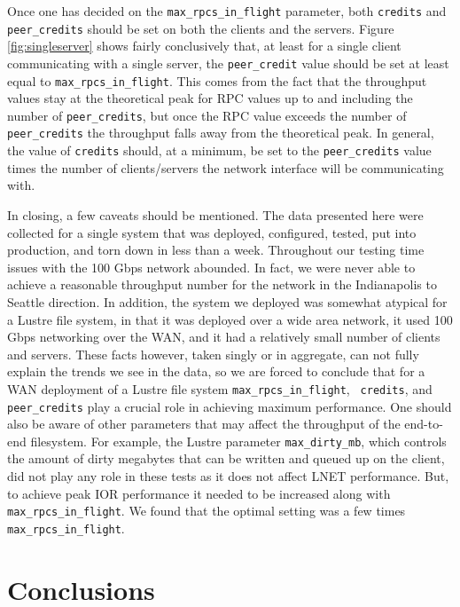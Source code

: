 \documentclass[]{sig-alternate}
\begin{document}
Once one has decided on the {\tt max\_rpcs\_in\_flight} parameter, both {\tt credits} and {\tt peer\_credits}
should be set on both the clients and the servers. Figure \ref{fig:singleserver} shows fairly conclusively
that, at least for a single client communicating with a single server, the {\tt peer\_credit} value should be
set at least equal to {\tt max\_rpcs\_in\_flight}. This comes from the fact that the throughput values stay at
the theoretical peak for RPC values up to and including the number of {\tt peer\_credits}, but once the RPC
value exceeds the number of {\tt peer\_credits} the throughput falls away from the theoretical peak. In
general, the value of {\tt credits} should, at a minimum, be set to the {\tt peer\_credits} value times the number of
clients/servers the network interface will be communicating with.

In closing, a few caveats should be mentioned. The data presented here were collected for a single system that
was deployed, configured, tested, put into production, and torn down in less than a week. Throughout our
testing time issues with the 100 Gbps network abounded. In fact, we were never able to achieve a reasonable
throughput number for the network in the Indianapolis to Seattle direction. In addition, the system we
deployed was somewhat atypical for a Lustre file system, in that it was deployed over a wide area network, it
used 100 Gbps networking over the WAN, and it had a relatively small number of clients and servers. These
facts however, taken singly or in aggregate, can not fully explain the trends we see in the data, so we are
forced to conclude that for a WAN deployment of a Lustre file system {\tt max\_rpcs\_in\_flight}, {\tt
  credits}, and {\tt peer\_credits} play a crucial role in achieving maximum performance. One should also be
aware of other parameters that may affect the throughput of the end-to-end filesystem. For example, the Lustre
parameter {\tt max\_dirty\_mb}, which controls the amount of dirty megabytes that can be written and queued up
on the client, did not play any role in these tests as it does not affect LNET performance.
But, to achieve peak IOR performance it needed to be increased along with {\tt max\_rpcs\_in\_flight}. We found
that the optimal setting was a few times {\tt max\_rpcs\_in\_flight}.

\section{Conclusions}\label{sec:conclusion}
\end{document}
